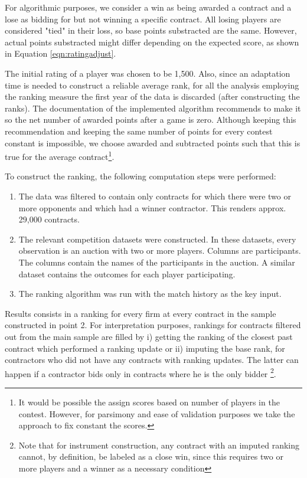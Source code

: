 For algorithmic purposes, we consider a win as being awarded a contract and a lose as bidding for but not winning a specific contract. All losing players are considered "tied" in their loss, so base points substracted are the same. However, actual points substracted might differ depending on the expected score, as shown in Equation \ref{eqn:ratingadjust}.

The initial rating of a player was chosen to be 1,500. Also, since an adaptation time is needed to construct a reliable average rank, for all the analysis employing the ranking measure the first year of the data is discarded (after constructing the ranks). The documentation of the implemented algorithm recommends to make it so the net number of awarded points after a game is zero. Although keeping this recommendation and keeping the same number of points for every contest constant is impossible, we choose awarded and subtracted points such that this is true for the average contract\footnote{It would be possible the assign scores based on number of players in the contest. However, for parsimony and ease of validation purposes we take the approach to fix constant the scores.}.

To construct the ranking, the following computation steps were performed:
\begin{enumerate}[itemsep=1pt]
  \item The data was filtered to contain only contracts for which there were two or more opponents and which had a winner contractor. This renders approx. 29,000 contracts.
  \item The relevant competition datasets were constructed. In these datasets, every observation is an auction with two or more players. Columns are participants. The columns contain the names of the participants in the auction. A similar dataset contains the outcomes for each player participating.
  \item The ranking algorithm was run with the match history as the key input.
\end{enumerate}
Results consists in a ranking for every firm at every contract in the sample constructed in point 2. For interpretation purposes, rankings for contracts filtered out from the main sample are filled by i) getting the ranking of the closest past contract which performed a ranking update or ii) imputing the base rank, for contractors who did not have any contracts with ranking updates. The latter can happen if a contractor bids only in contracts where he is the only bidder \footnote{Note that for instrument construction, any contract with an imputed ranking cannot, by definition, be labeled as a close win, since this requires two or more players and a winner as a necessary condition}.

